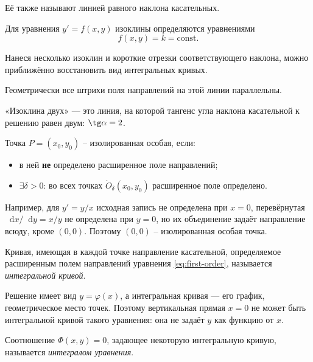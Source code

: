 \documentclass[12pt,a4paper]{article}
\numberwithin{equation}{section}
\newcommand{\Odp}[2]{\dot O_{#1}\!\left(#2\right)}
\newcommand{\dd}{\mathop{}\!\mathrm{d}}
\begin{document}
Её также называют линией равного наклона касательных.

Для уравнения \(y' = f(x, y)\) изоклины определяются уравнениями
\[
f(x,y)=k=\text{const}.
\]

\begin{remarkHSE}
Нанеся несколько изоклин и короткие отрезки соответствующего наклона, можно приближённо восстановить вид интегральных кривых.
\end{remarkHSE}

Геометрически все штрихи поля направлений на этой линии параллельны.

\begin{exampleHSE}
«Изоклина двух» --- это линия, на которой тангенс угла наклона касательной к решению равен двум: \(\tg\alpha = 2\).
\end{exampleHSE}

\begin{definitionHSE}
Точка \(P=(x_0,y_0)\) -- изолированная особая, если:
\begin{itemize}
\item в ней \textbf{не} определено расширенное поле направлений;
\item \(\exists\delta>0\): во всех точках \(\Odp{\delta}{x_0,y_0}\) расширенное поле определено.
\end{itemize} 
\end{definitionHSE}

Например, для \(y' = y/x\) исходная запись не определена при \(x = 0\), перевёрнутая
\({\dd x}/{\dd y} = x/y\) не определена при \(y = 0\), но их объединение задаёт направление всюду,
кроме \((0, 0)\). Поэтому \((0, 0)\) – изолированная особая точка.

\begin{definitionHSE}
Кривая, имеющая в каждой точке направление касательной, определяемое расширенным полем направлений уравнения \eqref{eq:first-order}, называется \textit{интегральной кривой}.
\end{definitionHSE}

Решение имеет вид \(y=\varphi(x)\), а интегральная кривая — его график, геометрическое место точек. Поэтому вертикальная прямая \(x=0\) не может быть интегральной кривой такого уравнения: она не задаёт \(y\) как функцию от \(x\).

\begin{definitionHSE}
Соотношение \(\Phi(x,y)=0\), задающее некоторую интегральную кривую, называется \textit{интегралом уравнения}.
\end{definitionHSE}
\end{document}
